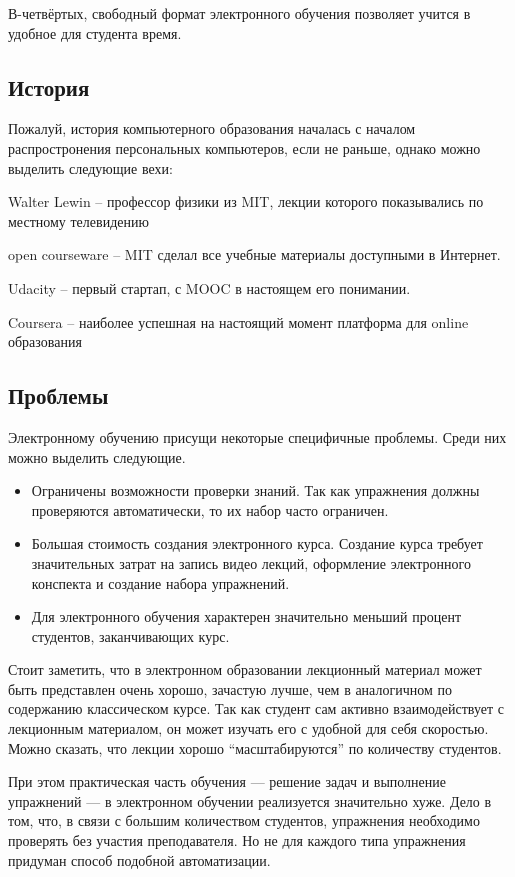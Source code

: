\documentclass{matmex-diploma-custom}
\begin{document}
В-четвёртых, свободный формат электронного обучения позволяет учится в
удобное для студента время.

\subsection*{История}
Пожалуй, история компьютерного образования началась с началом
распростронения персональных компьютеров, если не раньше, однако можно
выделить следующие вехи:

Walter Lewin -- профессор физики из MIT, лекции которого показывались
по местному телевидению

open courseware -- MIT сделал все учебные материалы доступными в Интернет.

Udacity -- первый стартап, с MOOC в настоящем его понимании.

Coursera -- наиболее успешная на настоящий момент платформа для online
образования

\subsection*{Проблемы}
Электронному обучению присущи некоторые специфичные проблемы. Среди них
можно выделить следующие.
\begin{itemize}
\item Ограничены возможности проверки знаний. Так как упражнения
  должны проверяются автоматически, то их набор часто ограничен.
\item Большая стоимость создания электронного курса. Создание курса требует
  значительных затрат на запись видео лекций, оформление электронного
  конспекта и создание набора упражнений.
\item Для электронного обучения характерен значительно
  меньший процент студентов, заканчивающих курс.
\end{itemize}

Стоит заметить, что в электронном образовании лекционный материал
может быть представлен очень хорошо, зачастую лучше, чем в аналогичном
по содержанию классическом курсе. Так как студент сам активно
взаимодействует с лекционным материалом, он может изучать его с
удобной для себя скоростью. Можно сказать, что лекции хорошо
``масштабируются'' по количеству студентов.

При этом практическая часть обучения --- решение задач и выполнение
упражнений --- в электронном обучении реализуется значительно хуже.
Дело в том, что, в связи с большим количеством студентов, упражнения
необходимо проверять без участия преподавателя. Но не для каждого типа
упражнения придуман способ подобной автоматизации.
\end{document}

